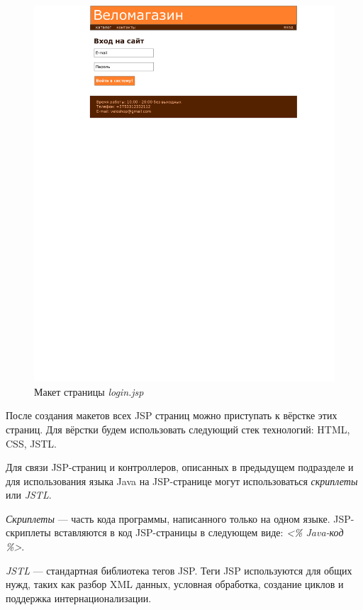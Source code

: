 \begin{figure}[h]
  \centering
  \includegraphics[width=140mm]{../design/wireframe/login.png}
  \caption{Макет страницы \textit{login.jsp}}
  \label{fig:wireframe_login}
\end{figure}

После создания макетов всех JSP страниц можно приступать к вёрстке этих страниц.
Для вёрстки будем использовать следующий стек технологий: HTML, CSS, JSTL.

Для связи JSP-страниц и контроллеров, описанных в предыдущем подразделе и для
использования языка Java на JSP-странице могут использоваться \textit{скриплеты}
или \textit{JSTL}.

\textit{Скриплеты} --- часть кода программы, написанного только на одном языке.
JSP-скриплеты вставляются в код JSP-страницы в следующем виде:
\textit{<\% Java-код \%>}.

\textit{JSTL} --- стандартная библиотека тегов JSP. Теги JSP используются
для общих нужд, таких как разбор XML данных, условная обработка, создание циклов и
поддержка интернационализации.

